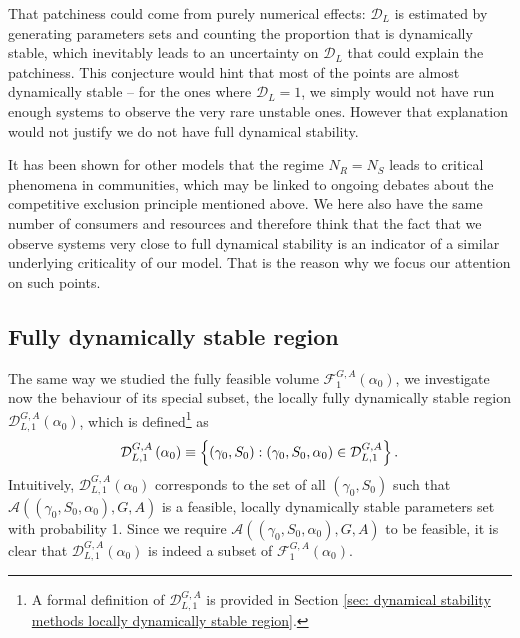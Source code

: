 \documentclass[12pt, titlepage]{report}
\begin{document}
That patchiness could come from purely numerical effects: $\mathcal{D}_L$ is estimated by generating parameters sets and counting the proportion that is dynamically stable, which inevitably leads to an uncertainty on $\mathcal{D}_L$ that could explain the patchiness. This conjecture would hint that most of the points are almost dynamically stable -- for the ones where $\mathcal{D}_L=1$, we simply would not have run enough systems to observe the very rare unstable ones. However that explanation would not justify  we do not have full dynamical stability.

It has been shown for other models \cite{biroli_marginally_2018} that the regime $N_R=N_S$ leads to critical phenomena in communities, which may be linked to ongoing debates about the competitive exclusion principle mentioned above. We here also have the same number of consumers and resources and therefore think that the fact that we observe systems very close to full dynamical stability is an indicator of a similar underlying criticality of our model. That is the reason why we focus our attention on such points.

\subsection{Fully dynamically stable region}\label{sec: dynamical stability methods fully dynamically stable region}
The same way we studied the fully feasible volume $\mathcal{F}_{1}^{G,A}(\alpha_0)$, we investigate now the behaviour of its special subset, the locally fully dynamically stable region $\mathcal{D}^{G,A}_{L,1}\left(\alpha_0\right)$, which is defined\footnote{A formal definition of $\mathcal{D}^{G,A}_{L,1}$ is provided in Section \ref{sec: dynamical stability methods locally dynamically stable region}.} as
\begin{equation}
\mathcal{D}_{L,1}^{G,A}\left(\alpha_0\right) \equiv \left\{ (\gamma_0, S_0) : (\gamma_0, S_0, \alpha_0) \in \mathcal{D}^{G,A}_{L,1} \right\}.
\end{equation}
 Intuitively, $\mathcal{D}^{G,A}_{L,1}\left(\alpha_0\right)$ corresponds to the set of all $(\gamma_0, S_0)$ such that $\mathcal{A}\left((\gamma_0, S_0, \alpha_0), G, A\right)$ is a feasible, locally dynamically stable parameters set with probability 1. Since we require $\mathcal{A}\left((\gamma_0, S_0, \alpha_0), G, A\right)$ to be feasible, it is clear that $\mathcal{D}^{G,A}_{L,1}\left(\alpha_0\right)$ is indeed a subset of $\mathcal{F}^{G,A}_1\left(\alpha_0\right)$.
\end{document}
